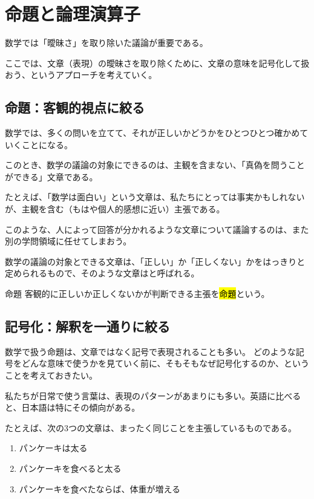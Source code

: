 \documentclass[../../imaging-math]{subfiles}
\begin{document}
\section{命題と論理演算子}

数学では「曖昧さ」を取り除いた議論が重要である。

ここでは、文章（表現）の曖昧さを取り除くために、文章の意味を記号化して扱おう、というアプローチを考えていく。

\subsection{命題：客観的視点に絞る}

数学では、多くの問いを立てて、それが正しいかどうかをひとつひとつ確かめていくことになる。

このとき、数学の議論の対象にできるのは、主観を含まない、「真偽を問うことができる」文章である。

\br

たとえば、「数学は面白い」という文章は、私たちにとっては事実かもしれないが、主観を含む（もはや個人的感想に近い）主張である。

このような、人によって回答が分かれるような文章について議論するのは、また別の学問領域に任せてしまおう。

\br

数学の議論の対象とできる文章は、「正しい」か「正しくない」かをはっきりと定められるもので、そのような文章はと呼ばれる。

\begin{definition}{命題}
  客観的に正しいか正しくないかが判断できる主張を\hl{命題}という。
\end{definition}

\subsection{記号化：解釈を一通りに絞る}

数学で扱う命題は、文章ではなく記号で表現されることも多い。
どのような記号をどんな意味で使うかを見ていく前に、そもそもなぜ記号化するのか、ということを考えておきたい。

\br

私たちが日常で使う言葉は、表現のパターンがあまりにも多い。英語に比べると、日本語は特にその傾向がある。

たとえば、次の3つの文章は、まったく同じことを主張しているものである。

\begin{enumerate}
  \item パンケーキは太る
  \item パンケーキを食べると太る
  \item パンケーキを食べたならば、体重が増える
\end{enumerate}
\end{document}

